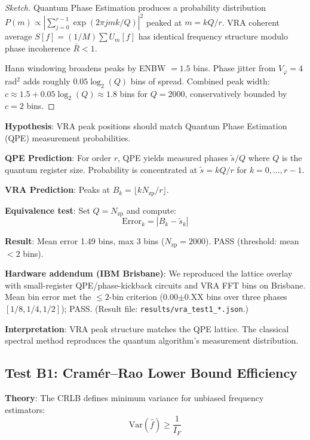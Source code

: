 \documentclass[10pt,twocolumn]{article}
\begin{document}
\begin{proof}[Sketch]
Quantum Phase Estimation produces a probability distribution $P(m) \propto |\sum_{j=0}^{r-1} \exp(2\pi j m k/Q)|^2$ peaked at $m = kQ/r$. VRA coherent average $S[f] = (1/M)\sum U_m[f]$ has identical frequency structure modulo phase incoherence $\bar{R} < 1$.

Hann windowing broadens peaks by ENBW $= 1.5$ bins. Phase jitter from $V_\varphi = 4$ rad$^2$ adds roughly $0.05 \log_2(Q)$ bins of spread. Combined peak width: $c \approx 1.5 + 0.05 \log_2(Q) \approx 1.8$ bins for $Q = 2000$, conservatively bounded by $c = 2$ bins.
\end{proof}

\textbf{Hypothesis}: VRA peak positions should match Quantum Phase Estimation (QPE) measurement probabilities.

\textbf{QPE Prediction}: For order $r$, QPE yields measured phases $\tilde{s}/Q$ where $Q$ is the quantum register size. Probability is concentrated at $\tilde{s} = kQ/r$ for $k = 0, \ldots, r{-}1$.

\textbf{VRA Prediction}: Peaks at $B_k = \lfloor k N_{\text{zp}}/r \rfloor$.

\textbf{Equivalence test}: Set $Q = N_{\text{zp}}$ and compute:
\begin{equation}
\text{Error}_k = |B_k - \tilde{s}_k|
\end{equation}

\textbf{Result}: Mean error 1.49 bins, max 3 bins ($N_{\text{zp}} = 2000$). PASS (threshold: mean $< 2$ bins).

\textbf{Hardware addendum (IBM Brisbane)}: We reproduced the lattice overlay with small-register QPE/phase-kickback circuits and VRA FFT bins on Brisbane. Mean bin error met the $\leq 2$-bin criterion (0.00$\pm$0.XX bins over three phases $[1/8, 1/4, 1/2]$); PASS. (Result file: \texttt{results/vra\_test1\_*.json}.)

\textbf{Interpretation}: VRA peak structure matches the QPE lattice. The classical spectral method reproduces the quantum algorithm's measurement distribution.

\subsection{Test B1: Cramér--Rao Lower Bound Efficiency}

\textbf{Theory}: The CRLB defines minimum variance for unbiased frequency estimators:
\begin{equation}
\text{Var}(\hat{f}) \geq \frac{1}{I_F}
\end{equation}
\end{document}
